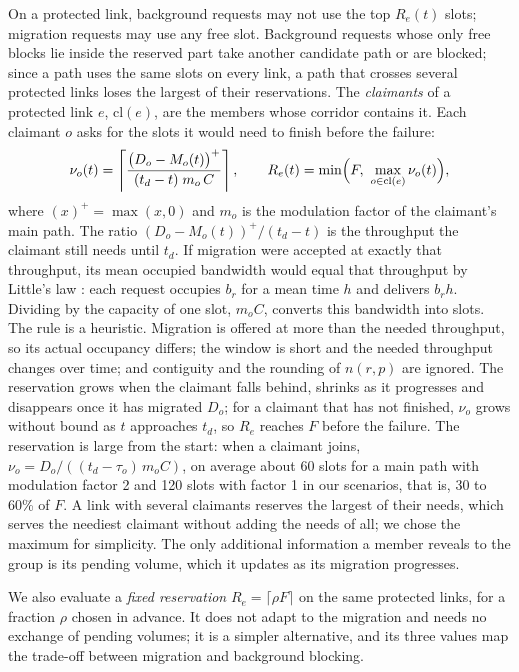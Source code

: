 \documentclass[11pt,a4paper]{article}
\theoremstyle{definition}
\begin{document}
On a protected link, background requests may not use the top $R_e(t)$ slots; migration requests may use any free slot.
Background requests whose only free blocks lie inside the reserved part take another candidate path or are blocked; since a path uses the same slots on every link, a path that crosses several protected links loses the largest of their reservations.
The \emph{claimants} of a protected link $e$, $\mathrm{cl}(e)$, are the members whose corridor contains it.
Each claimant $o$ asks for the slots it would need to finish before the failure:
\begin{equation}
  \nu_o(t) = \left\lceil \frac{\bigl(D_o-M_o(t)\bigr)^{+}}{(t_d-t)\; m_o\,C} \right\rceil ,
  \qquad
  R_e(t)=\min\Bigl(F,\ \max_{o \in \mathrm{cl}(e)} \nu_o(t)\Bigr),
\end{equation}
where $(x)^{+}=\max(x,0)$ and $m_o$ is the modulation factor of the claimant's main path.
The ratio $(D_o-M_o(t))^{+}/(t_d-t)$ is the throughput the claimant still needs until $t_d$.
If migration were accepted at exactly that throughput, its mean occupied bandwidth would equal that throughput by Little's law \cite{little1961}: each request occupies $b_r$ for a mean time $h$ and delivers $b_r h$. Dividing by the capacity of one slot, $m_o C$, converts this bandwidth into slots.
The rule is a heuristic.
Migration is offered at more than the needed throughput, so its actual occupancy differs; the window is short and the needed throughput changes over time; and contiguity and the rounding of $n(r,p)$ are ignored.
The reservation grows when the claimant falls behind, shrinks as it progresses and disappears once it has migrated $D_o$; for a claimant that has not finished, $\nu_o$ grows without bound as $t$ approaches $t_d$, so $R_e$ reaches $F$ before the failure.
The reservation is large from the start: when a claimant joins, $\nu_o=D_o/((t_d-\tau_o)\,m_o C)$, on average about 60 slots for a main path with modulation factor 2 and 120 slots with factor 1 in our scenarios, that is, 30 to 60\% of $F$.
A link with several claimants reserves the largest of their needs, which serves the neediest claimant without adding the needs of all; we chose the maximum for simplicity.
The only additional information a member reveals to the group is its pending volume, which it updates as its migration progresses.

We also evaluate a \emph{fixed reservation} $R_e=\lceil \rho F\rceil$ on the same protected links, for a fraction $\rho$ chosen in advance.
It does not adapt to the migration and needs no exchange of pending volumes; it is a simpler alternative, and its three values map the trade-off between migration and background blocking.
\end{document}
